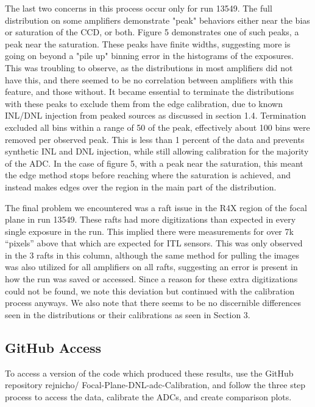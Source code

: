 \documentclass[11pt, letterpaper]{article}
\begin{document}
The last two concerns in this process occur only for run 13549.  
The full distribution on some amplifiers demonstrate "peak" behaviors either near the bias or saturation of the CCD, or both.
Figure 5 demonstrates one of such peaks, a peak near the saturation.  
These peaks have finite widths, suggesting more is going on beyond a "pile up" binning error in the histograms of the exposures. 
This was troubling to observe, as the distributions in most amplifiers did not have this, and there seemed to be no correlation between amplifiers with this feature, and those without. 
It became essential to terminate the distributions with these peaks to exclude them from the edge calibration, due to known INL/DNL injection from peaked sources as discussed in section 1.4. 
Termination excluded all bins within a range of 50 of the peak, effectively about 100 bins were removed per observed peak. 
This is less than 1 percent of the data and prevents synthetic INL and DNL injection, while still allowing calibration for the majority of the ADC. 
In the case of figure 5, with a peak near the saturation, this meant the edge method stops before reaching where the saturation is achieved, and instead makes edges over the region in the main part of the distribution. 
\indent


The final problem we encountered was a raft issue in the R4X region of the focal plane in run 13549. 
These rafts had more digitizations than expected in every single exposure in the run. 
This implied there were measurements for over 7k “pixels” above that which are expected for ITL sensors. 
This was only observed in the 3 rafts in this column, although the same method for pulling the images was also utilized for all amplifiers on all rafts, suggesting an error is present in how the run was saved or accessed. 
Since a reason for these extra digitizations could not be found, we note this deviation but continued with the calibration process anyways. 
We also note that there seems to be no discernible differences seen in the distributions or their calibrations as seen in Section 3. 

\subsection{GitHub Access}
\indent 


To access a version of the code which produced these results, use the GitHub repository rejnicho/
Focal-Plane-DNL-adc-Calibration, and follow the three step process to access the data, calibrate the ADCs, and create comparison plots. 
\end{document}
